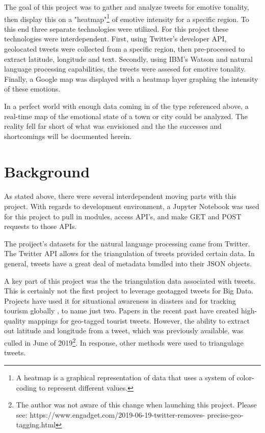 \documentclass[12pt, oneside]{article}
\begin{document}
The goal of this project was to gather and analyze tweets for emotive tonality,
then display this on a "heatmap"\footnote{A heatmap is a graphical
representation of data that uses a system of color-coding to represent
different values.} of emotive intensity for a specific
region. To this end three separate technologies were utilized. For this
project  these technologies were interdependent. First, using Twitter's
developer API, geolocated tweets were collected from a specific region, then
pre-processed to extract latitude, longitude and text. Secondly, using IBM's
Watson and natural language processing capabilities, the tweets were assesed
for emotive tonality. Finally, a Google map was
displayed with a heatmap layer graphing the intensity of these emotions.

In a perfect world with enough data coming in of the type referenced above, a
real-time map of the emotional state of a town or city could be analyzed. The
reality fell far short of what was envisioned and the the successes and
shortcomings will be documented herein.


\section{Background}
\paragraph{}
As stated above, there were several interdependent moving parts with this
project. With regards to development environment, a Jupyter Notebook was used
for this project to pull in modules, access API's, and make GET and POST
requests to those APIs.

The proiject's datasets for the natural language processing came from Twitter.
The Twitter API allows for the triangulation of tweets provided certain
data\cite{TwitterGeo}. In general, tweets have a great deal of metadata bundled
into their JSON objects.

A key part of this project was the the triangulation data associated with
tweets. This is certainly not the first project to leverage geotagged tweets
for Big Data. Projects have used it for situational awareness in
diasters\cite{verma2011} and for tracking tourism globally \cite{tourism2013},
to name just two. Papers in the recent past have created high-quality mappings
for geo-tagged tourist tweets\cite{tourist2018}. However, the ability to
extract out latitude and longitude
from a tweet, which was previously available, was culled in June of
2019\footnote{The author was not aware of this change when launching this
project. Please see: https://www.engadget.com/2019-06-19-twitter-removes-
precise-geo-tagging.html}. In response, other methods were used to triangulage
tweets.
\end{document}
